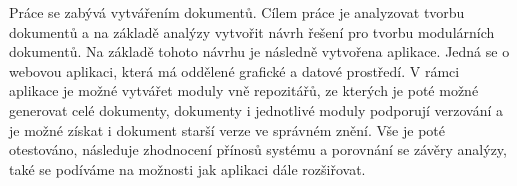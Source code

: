 Práce se zabývá vytvářením dokumentů. Cílem práce je analyzovat tvorbu dokumentů a na základě analýzy vytvořit návrh řešení pro tvorbu
modulárních dokumentů. Na základě tohoto návrhu je následně vytvořena aplikace.
Jedná se o webovou aplikaci, která má oddělené grafické a datové prostředí.
V rámci aplikace je možné vytvářet moduly vně repozitářů, ze kterých je poté možné generovat celé dokumenty, dokumenty i jednotlivé moduly podporují verzování
a je možné získat i dokument starší verze ve správném znění.
Vše je poté otestováno, následuje zhodnocení přínosů systému a porovnání se závěry analýzy, také se podíváme na možnosti jak aplikaci dále rozšiřovat.